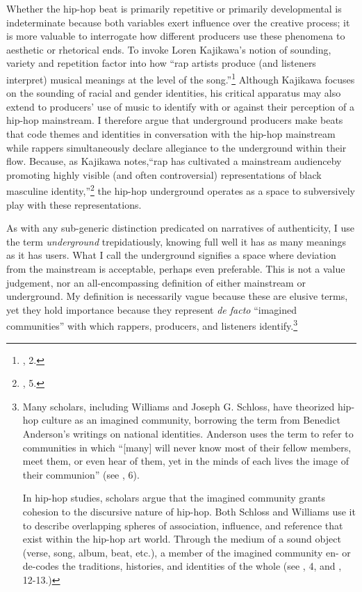 Whether the hip-hop beat is primarily repetitive or primarily developmental is indeterminate because 
both variables exert influence over the creative process; it is more valuable to interrogate how different
producers use these phenomena to aesthetic or rhetorical ends. To invoke Loren Kajikawa's notion of
sounding, variety and repetition factor into how ``rap artists produce (and listeners interpret) musical
meanings at the level of the song.''\footnote{\cite{lorenkajikawaSoundingRaceRap2015}, 2.} Although Kajikawa
focuses on the sounding of racial and gender identities, his critical apparatus may also extend to producers'
use of music to identify with or against their perception of a hip-hop mainstream. I therefore argue that
underground producers make beats that code themes and identities in conversation with the hip-hop mainstream
while rappers simultaneously declare allegiance to the underground within their flow. Because, as Kajikawa
notes,``rap has cultivated a mainstream audience\textellipsis by promoting highly visible (and often
controversial) representations of black masculine identity,''\footnote{\cite{lorenkajikawaSoundingRaceRap2015}, 5.} the hip-hop underground operates as 
a space to subversively play with these representations.

As with any sub-generic distinction predicated on narratives of authenticity, I use the term
\emph{underground} trepidatiously, knowing full well it has as many meanings as it has users. What I 
call the underground signifies a space where deviation from the mainstream is acceptable, perhaps even
preferable. This is not a value judgement, nor an all-encompassing definition of either mainstream or
underground. My definition is necessarily vague because these are elusive terms, yet they hold importance
because they represent \textit{de facto} ``imagined communities'' with which rappers, producers, and
listeners identify.\footnote{Many scholars, including Williams and Joseph G. Schloss, have theorized 
hip-hop culture as an imagined community, borrowing the term from Benedict Anderson's writings on national
identities. Anderson uses the term to refer to communities in which ``[many] will never know most of their
fellow members, meet them, or even hear of them, yet in the minds of each lives the image of their
communion'' (see \cite{benedictandersonImaginedCommunitiesReflections2006}, 6).

In hip-hop studies, scholars argue that the imagined community grants cohesion to the discursive 
nature of hip-hop. Both Schloss and Williams use it to describe overlapping spheres of association,
influence, and reference that exist within the hip-hop art world. Through the medium of a sound object
(verse, song, album, beat, etc.), a member of the imagined community en- or de-codes the traditions,
histories, and identities of the whole (see \cite{josephgschlossMakingBeatsArt2004}, 4, and
\cite{justinawilliamsRhyminStealinMusical2013}, 12-13.)}

